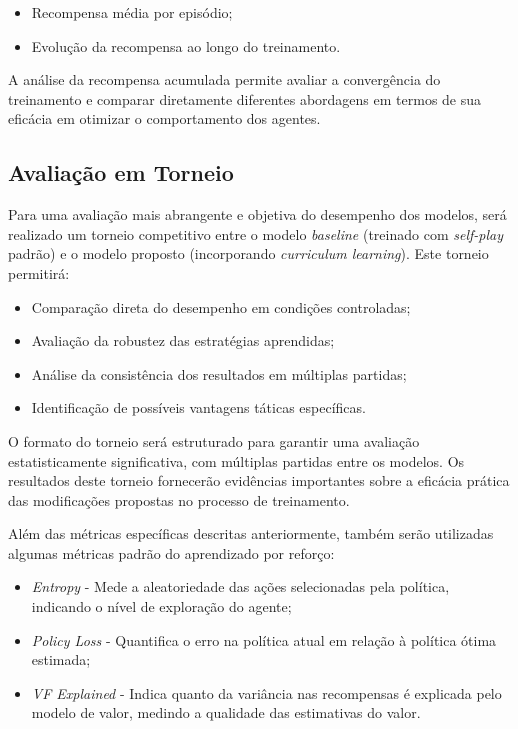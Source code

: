 \begin{itemize}
    \item Recompensa média por episódio;
    \item Evolução da recompensa ao longo do treinamento.
\end{itemize}

A análise da recompensa acumulada permite avaliar a convergência do treinamento e comparar diretamente diferentes abordagens em termos de sua eficácia em otimizar o comportamento dos agentes.

\subsection{Avaliação em Torneio}

Para uma avaliação mais abrangente e objetiva do desempenho dos modelos, será realizado um torneio competitivo entre o modelo \textit{baseline} (treinado com \textit{self-play} padrão) e o modelo proposto (incorporando \textit{curriculum learning}). Este torneio permitirá:

\begin{itemize}
    \item Comparação direta do desempenho em condições controladas;
    \item Avaliação da robustez das estratégias aprendidas;
    \item Análise da consistência dos resultados em múltiplas partidas;
    \item Identificação de possíveis vantagens táticas específicas.
\end{itemize}

O formato do torneio será estruturado para garantir uma avaliação estatisticamente significativa, com múltiplas partidas entre os modelos. Os resultados deste torneio fornecerão evidências importantes sobre a eficácia prática das modificações propostas no processo de treinamento.


Além das métricas específicas descritas anteriormente, também serão utilizadas algumas métricas padrão do aprendizado por reforço:

\begin{itemize}
    \item \textit{Entropy} - Mede a aleatoriedade das ações selecionadas pela política, indicando o nível de exploração do agente;
    \item \textit{Policy Loss} - Quantifica o erro na política atual em relação à política ótima estimada;
    \item \textit{VF Explained} - Indica quanto da variância nas recompensas é explicada pelo modelo de valor, medindo a qualidade das estimativas do valor.
\end{itemize}


